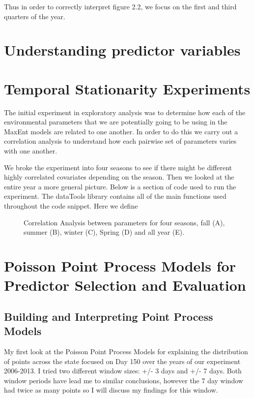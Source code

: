 \noindent Thus in order to correctly interpret figure 2.2, we focus on the first and third quarters of the year.   



\section{Understanding predictor variables}

\section{Temporal Stationarity Experiments }

The initial experiment in exploratory analysis was to determine how each of the environmental parameters that we are potentially going to be using in the MaxEnt models are related to one another. In order to do this we carry out a correlation analysis to understand how each pairwise set of parameters varies with one another. \newline

\noindent We broke the experiment into four seasons to see if there might be different highly correlated covariates depending on the season. Then we looked at the entire year a more general picture. Below is a section of code used to run the experiment. The dataTools library contains all of the main functions used throughout the code snippet. Here we define 

\begin{figure} [!ht]
\centerline{}
\caption{Correlation Analysis between parameters for four seasons, fall (A), summer (B), winter (C), Spring (D) and all year (E).}
\label{fig6}
\end{figure}


\section{Poisson Point Process Models for Predictor Selection and Evaluation}

\subsection{ Building and Interpreting Point Process Models}

\noindent My first look at the Poisson Point Process Models for explaining the distribution of points across the state focused on Day 150 over the years of our experiment 2006-2013. I tried two different window sizes: +/- 3 days and +/- 7 days. Both window periods have lead me to similar conclusions, however the 7 day window had twice as many points so I will discuss my findings for this window.\newline

